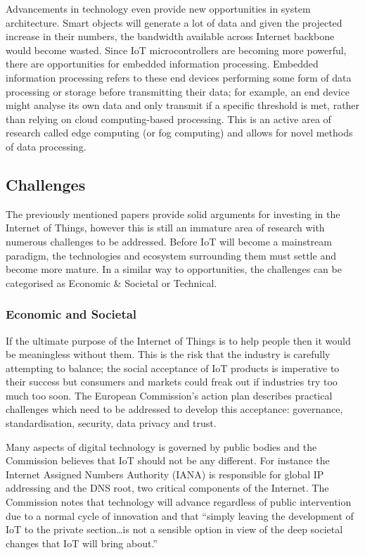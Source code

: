         Advancements in technology even provide new opportunities in system architecture. Smart objects will generate a lot of data and given the projected increase in their numbers, the bandwidth available across Internet backbone would become wasted. Since IoT microcontrollers are becoming more powerful, there are opportunities for embedded information processing. Embedded information processing refers to these end devices performing some form of data processing or storage before transmitting their data; for example, an end device might analyse its own data and only transmit if a specific threshold is met, rather than relying on cloud computing-based processing. This is an active area of research called edge computing (or fog computing) and allows for novel methods of data processing.

    \subsection{Challenges}
      The previously mentioned papers provide solid arguments for investing in the Internet of Things, however this is still an immature area of research with numerous challenges to be addressed. Before IoT will become a mainstream paradigm, the technologies and ecosystem surrounding them must settle and become more mature. In a similar way to opportunities, the challenges can be categorised as Economic \& Societal or Technical.

      \subsubsection{Economic and Societal}
        If the ultimate purpose of the Internet of Things is to help people then it would be meaningless without them. This is the risk that the industry is carefully attempting to balance; the social acceptance of IoT products is imperative to their success but consumers and markets could freak out if industries try too much too soon. The European Commission's action plan describes practical challenges which need to be addressed to develop this acceptance: governance, standardisation, security, data privacy and trust.

        Many aspects of digital technology is governed by public bodies and the Commission believes that IoT should not be any different. For instance the Internet Assigned Numbers Authority (IANA) is responsible for global IP addressing and the DNS root, two critical components of the Internet. The Commission notes that technology will advance regardless of public intervention due to a normal cycle of innovation and that ``simply leaving the development of IoT to the private section\ldots is not a sensible option in view of the deep societal changes that IoT will bring about.''

